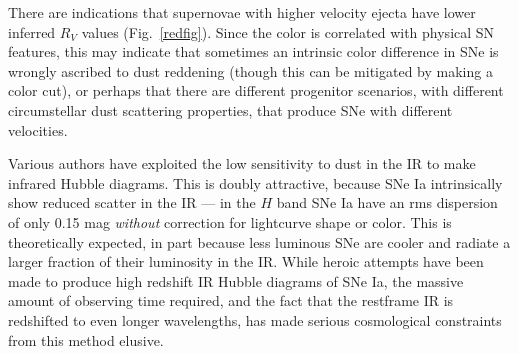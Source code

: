 \documentclass{nature1}
\begin{document}
There are indications that supernovae with higher velocity ejecta have
lower inferred $R_V$ values\citep{2009ApJ...699L.139W}
(Fig.~\ref{redfig}).  Since the color is correlated with physical SN
features, this may indicate that sometimes an intrinsic color
difference in SNe is wrongly ascribed to dust reddening (though this
can be mitigated by making a color cut), or perhaps that there are
different progenitor scenarios, with different circumstellar dust
scattering properties, that produce SNe with different velocities.

Various authors have exploited the low sensitivity to dust in the IR
to make infrared Hubble diagrams.  This is doubly attractive, because
SNe Ia intrinsically show reduced scatter in the IR --- in the $H$
band SNe Ia have an rms dispersion of only 0.15 mag {\it without}
correction for lightcurve shape or
color\citep{2004ApJ...602L..81K,2008ApJ...689..377W}.  This is
theoretically expected, in part because less luminous SNe are cooler
and radiate a larger fraction of their luminosity in the
IR\citep{2006ApJ...649..939K}.  While heroic attempts have been made
to produce high redshift IR Hubble diagrams of SNe Ia\citep{2009ApJ...704.1036F}, the massive
amount of observing time required, and the fact that the restframe IR
is redshifted to even longer wavelengths, has made serious
cosmological constraints from this method
elusive.


\end{document}
